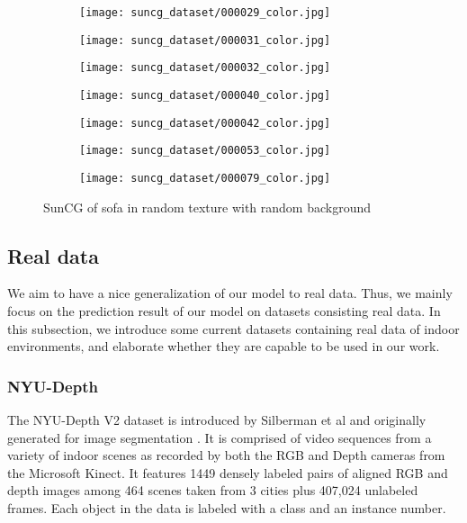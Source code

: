 \begin{figure}[h!]
\begin{subfigure}[b]{0.32\linewidth}
  \end{subfigure}
  \begin{subfigure}[b]{0.32\linewidth}
    \texttt{[image: suncg\_dataset/000029\_color.jpg]}
  \end{subfigure}
  \begin{subfigure}[b]{0.32\linewidth}
    \texttt{[image: suncg\_dataset/000031\_color.jpg]}
  \end{subfigure}
  \begin{subfigure}[b]{0.32\linewidth}
    \texttt{[image: suncg\_dataset/000032\_color.jpg]}
  \end{subfigure}
  \begin{subfigure}[b]{0.32\linewidth}
    \texttt{[image: suncg\_dataset/000040\_color.jpg]}
  \end{subfigure}
  \begin{subfigure}[b]{0.32\linewidth}
    \texttt{[image: suncg\_dataset/000042\_color.jpg]}
  \end{subfigure}
  \begin{subfigure}[b]{0.32\linewidth}
    \texttt{[image: suncg\_dataset/000053\_color.jpg]}
  \end{subfigure}
  \begin{subfigure}[b]{0.32\linewidth}
    \texttt{[image: suncg\_dataset/000079\_color.jpg]}
  \end{subfigure}
  \caption{SunCG of sofa in random texture with random background}
  \label{fig:suncg_dataset}
\end{figure}


\subsection{Real data}
We aim to have a nice generalization of our model to real data. Thus, we mainly focus on the prediction result of our model on datasets consisting real data. In this subsection, we introduce some current datasets containing real data of indoor environments, and elaborate whether they are capable to be used in our work.

\subsubsection{NYU-Depth}
The NYU-Depth V2 dataset is introduced by Silberman et al and originally generated for image segmentation \cite{Silberman:ECCV12}. It is comprised of video sequences from a variety of indoor scenes as recorded by both the RGB and Depth cameras from the Microsoft Kinect. It features 1449 densely labeled pairs of aligned RGB and depth images among 464 scenes taken from 3 cities plus 407,024 unlabeled frames. Each object in the data is labeled with a class and an instance number.

